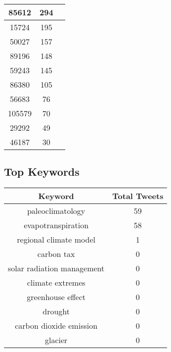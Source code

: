 \documentclass{article}\usepackage[T1]{fontenc}
\begin{document}
\begin{tabular}{|c|c|c|}
 \hline
85612 & 294\\ 
 \hline
15724 & 195\\ 
 \hline
50027 & 157\\ 
 \hline
89196 & 148\\ 
 \hline
59243 & 145\\ 
 \hline
86380 & 105\\ 
 \hline
56683 & 76\\ 
 \hline
105579 & 70\\ 
 \hline
29292 & 49\\ 
 \hline
46187 & 30\\ 
 \hline
\end{tabular}\subsection*{Top Keywords}\begin{tabular}{|c|c|}         \hline         Keyword & Total Tweets \\ 
 \hline
paleoclimatology & 59\\ 
 \hline
evapotranspiration & 58\\ 
 \hline
regional climate model & 1\\ 
 \hline
carbon tax & 0\\ 
 \hline
solar radiation management & 0\\ 
 \hline
climate extremes & 0\\ 
 \hline
greenhouse effect & 0\\ 
 \hline
drought & 0\\ 
 \hline
carbon dioxide emission & 0\\ 
 \hline
glacier & 0\\ 
 \hline
\end{tabular}
\end{document}
